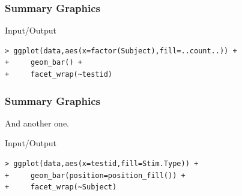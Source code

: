 \documentclass[xcolor={table},c]{beamer}
\begin{document}
\begin{frame}[fragile]\frametitle{Summary Graphics}
\begin{exampleblock}{Input/Output}\tiny
\begin{verbatim}
> ggplot(data,aes(x=factor(Subject),fill=..count..)) +
+     geom_bar() +
+     facet_wrap(~testid)
\end{verbatim}
    \end{exampleblock}
\begin{center}
\end{center}
\end{frame}

\begin{frame}[fragile]\frametitle{Summary Graphics}
And another one.
\begin{exampleblock}{Input/Output}\tiny
\begin{verbatim}
> ggplot(data,aes(x=testid,fill=Stim.Type)) +
+     geom_bar(position=position_fill()) +
+     facet_wrap(~Subject)
\end{verbatim}
    \end{exampleblock}
\begin{center}
\end{center}
\end{frame}


\appendix
\flushlinkimages
\end{document}
